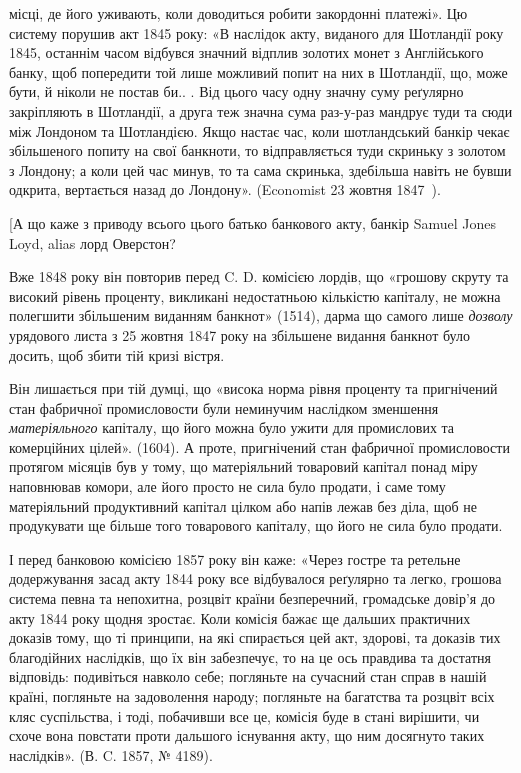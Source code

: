 \parcont{}  %
місці, де його уживають, коли доводиться робити закордонні платежі». Цю систему
порушив акт 1845 року: «В наслідок акту, виданого для Шотландії
року 1845, останнім часом відбувся значний відплив золотих монет з Англійського
банку, щоб попередити той лише можливий попит на них в Шотландії,
що, може бути, й ніколи не постав би.. . Від цього часу одну значну суму
реґулярно закріпляють в Шотландії, а друга теж значна сума раз-у-раз мандрує
туди та сюди між Лондоном та Шотландією. Якщо настає час, коли шотландський
банкір чекає збільшеного попиту на свої банкноти, то відправляється
туди скриньку з золотом з Лондону; а коли цей час минув, то та сама скринька,
здебільша навіть не бувши одкрита, вертається назад до Лондону». (Economist
23 жовтня 1847~).

[А що каже з приводу всього цього батько банкового акту, банкір Samuel
Jones Loyd, alias лорд Оверстон?

Вже 1848 року він повторив перед C. D. комісією лордів, що «грошову
скруту та високий рівень проценту, викликані недостатньою кількістю капіталу,
не можна полегшити збільшеним виданням банкнот» (1514), дарма що
самого лише \emph{дозволу} урядового листа з 25 жовтня 1847 року на збільшене
видання банкнот було досить, щоб збити тій кризі вістря.

Він лишається при тій думці, що «висока норма рівня проценту та пригнічений
стан фабричної промисловости були неминучим наслідком зменшення
\emph{матеріяльного} капіталу, що його можна було ужити для промислових та комерційних
цілей». (1604). А проте, пригнічений стан фабричної промисловости
протягом місяців був у тому, що матеріяльний товаровий капітал понад міру
наповнював комори, але його просто не сила було продати, і саме тому матеріяльний
продуктивний капітал цілком або напів лежав без діла, щоб не продукувати
ще більше того товарового капіталу, що його не сила було продати.

І перед банковою комісією 1857 року він каже: «Через гостре та ретельне
додержування засад акту 1844 року все відбувалося реґулярно та легко, грошова
система певна та непохитна, розцвіт країни безперечний, громадське довір’я
до акту 1844 року щодня зростає. Коли комісія бажає ще дальших
практичних доказів тому, що ті принципи, на які спирається цей акт, здорові,
та доказів тих благодійних наслідків, що їх він забезпечує, то на це ось правдива
та достатня відповідь: подивіться навколо себе; погляньте на сучасний
стан справ в нашій країні, погляньте на задоволення народу; погляньте на
багатства та розцвіт всіх кляс суспільства, і тоді, побачивши все це, комісія
буде в стані вирішити, чи схоче вона повстати проти дальшого існування акту,
що ним досягнуто таких наслідків». (В. C. 1857, № 4189).

